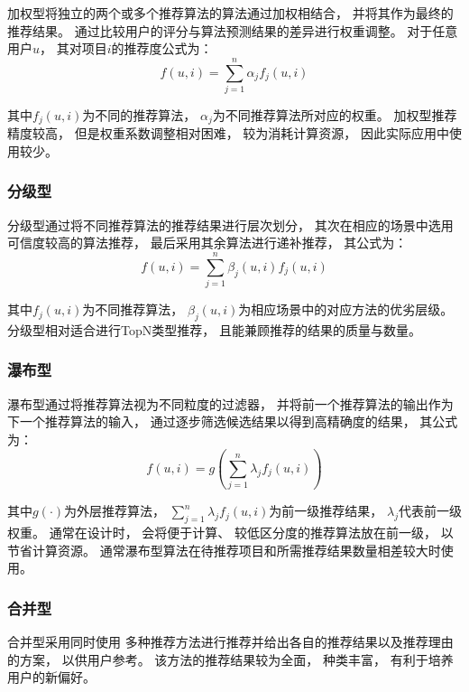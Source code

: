 加权型将独立的两个或多个推荐算法的算法通过加权相结合，
并将其作为最终的推荐结果。
通过比较用户的评分与算法预测结果的差异进行权重调整。
对于任意用户$u$，
其对项目$i$的推荐度公式为：
\begin{equation}
    f(u,i)=\sum_{j=1}^n\alpha_j f_j(u,i)
\end{equation}

其中$f_j(u,i)$为不同的推荐算法，
$\alpha_j$为不同推荐算法所对应的权重。
加权型推荐精度较高，
但是权重系数调整相对困难，
较为消耗计算资源，
因此实际应用中使用较少。

\subsubsection{分级型}

分级型通过将不同推荐算法的推荐结果进行层次划分，
其次在相应的场景中选用可信度较高的算法推荐，
最后采用其余算法进行递补推荐，
其公式为：
\begin{equation}
    f(u,i)=\sum_{j=1}^n\beta_j(u,i)f_j(u,i)
\end{equation}

其中$f_j(u,i)$为不同推荐算法，
$\beta_j(u,i)$为相应场景中的对应方法的优劣层级。
分级型相对适合进行TopN类型推荐，
且能兼顾推荐的结果的质量与数量。

\subsubsection{瀑布型}

瀑布型通过将推荐算法视为不同粒度的过滤器，
并将前一个推荐算法的输出作为下一个推荐算法的输入，
通过逐步筛选候选结果以得到高精确度的结果，
其公式为：
\begin{equation}
    f(u,i)=g\left(\sum_{j=1}^n\lambda_j f_j(u,i)\right)
\end{equation}

其中$g(\cdot)$为外层推荐算法，
$\sum_{j=1}^n\lambda_j f_j(u,i)$为前一级推荐结果，
$\lambda_j$代表前一级权重。
通常在设计时，
会将便于计算、
较低区分度的推荐算法放在前一级，
以节省计算资源。
通常瀑布型算法在待推荐项目和所需推荐结果数量相差较大时使用。

\subsubsection{合并型}

合并型采用同时使用
多种推荐方法进行推荐并给出各自的推荐结果以及推荐理由
的方案，
以供用户参考。
该方法的推荐结果较为全面，
种类丰富，
有利于培养用户的新偏好。

